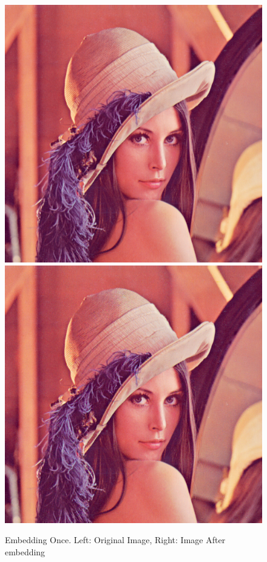 \documentclass[12pt]{article}
\begin{document}
\begin{figure}[h]
\centerline{%
\includegraphics[scale=0.45]{"lena"}%
\hspace{0.1cm}
\includegraphics[scale=0.45]{"Lena Embed once 0.7 threshold/finalImage"}%
}%
\caption{Embedding Once. Left: Original Image, Right: Image After embedding}
\label{fig:lenaEmbedOnceEmbedding}
\end{figure}
\end{document}
